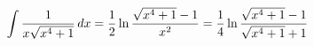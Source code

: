 $$\int {1\over{x\sqrt{x^4+1}}} \, dx
={1\over2} \ln {{\sqrt{x^4+1}-1}\over{x^2}}
={1\over4} \ln {{\sqrt{x^4+1}-1}\over{\sqrt{x^4+1}+1}}$$

\endexample

\begin{comment}
\vfill\eject
\mysection{Chebyshev's Integral}

\example Compute:
\label{Chebyshev's Integral}
$$\int {{2x^6+4x^5+7x^4-3x^3-x^2-8x-8}\over{(2x^2-1)^2\sqrt{x^4+4 x^3+2 x^2+1}}} \,{\rm d}x$$

The polynomial under the square root is square-free:

\begin{maximablock}
num : 2*x^6 + 4*x^5 + 7*x^4-3*x^3-x^2-8*x-8$
den : (2*x^2-1)^2$
root : x^4+4*x^3+2*x^2+1$

f : y^2 - root$
integral : num/(den*y) * del(x)$
\end{maximablock}

\begin{maximablock}
solve(root);
solve(den);
\end{maximablock}

\begin{maximablock}
for r in append(solve(root), solve(den), [x=inf]) do
  disp(puiseux(f,x,y,rhs(r),false,-1,integral))$
\end{maximablock}

We have second order poles at $x=\pm\frac{1}{\sqrt{2}}$ and infinity.
There are also first order components, which indicates that we
will have both algebraic and logarithmic components.

Let's extract the disivors at which there are poles:

\begin{maximablock}
extract_divisor(x0) :=
  apply(append,
    map(lambda([exp], if is(exp[1] # 0) then [[[if rhs(exp[2]) # 1/x then x-rhs(exp[2]) else inf, rhs(exp[3])], -2]] else []),
        puiseux(f,x,y,rhs(x0),false,-1,integral)))
$
div : unique(apply(append, map(extract_divisor, append(solve(root), solve(den), [x=inf]))));
\end{maximablock}

Our basis, principal parts matrix and its pseudoinverse:

\begin{maximablock}
/* This runs forever */
basis : riemannroch(f,x,y,div);

m : principal_parts_matrix(f,x,y, basis, div);

pi : pseudoinverse(m);
\end{maximablock}

\endexample
\end{comment}

